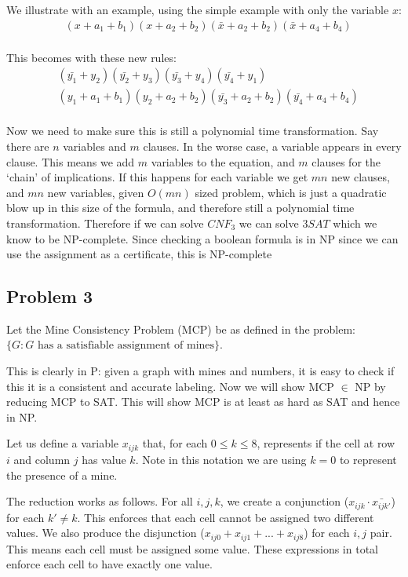 \documentclass[english]{article}
\begin{document}
We illustrate with an example, using the simple example with only the variable $x$:
\begin{align*}
& (x + a_1 + b_1)(x + a_2 + b_2)(\bar{x} + a_2 + b_2)(\bar{x} + a_4 + b_4) \\
\end{align*}

This becomes with these new rules:
\begin{align*}
& (\bar{y_1} + y_2)(\bar{y_2} + y_3)(\bar{y_3} + y_4)(\bar{y_4} + y_1) \\
& (y_1 + a_1 + b_1)(y_2 + a_2 + b_2)(\bar{y_3} + a_2 + b_2)(\bar{y_4} + a_4 + b_4) \\
\end{align*}

Now we need to make sure this is still a polynomial time transformation. Say there are $n$ variables and $m$
clauses. In the worse case, a variable appears in every clause. This means we add $m$ variables to the equation,
and $m$ clauses for the `chain' of implications. If this happens for each variable we get $mn$ new clauses, and
$mn$ new variables, given $O(mn)$ sized problem, which is just a quadratic blow up in this size of the formula,
and therefore still a polynomial time transformation. Therefore if we can solve $CNF_3$ we can solve $3SAT$ which
we know to be NP-complete. Since checking a boolean formula is in NP since we can use the assignment as a 
certificate, this is NP-complete

\subsection*{Problem 3}
Let the Mine Consistency Problem (MCP) be as defined in the problem:\\
$\{G : G \text{ has a satisfiable assignment of mines}\}$.

This is clearly in P: given a graph with mines and numbers, it is easy to check if this it is a
consistent and accurate labeling. Now we will show MCP $\in$ NP by reducing MCP to SAT. This will
show MCP is at least as hard as SAT and hence in NP.

Let us define a variable $x_{ijk}$ that, for each $0 \le k \le 8$, represents if the cell at row $i$
and column $j$ has value $k$. Note in this notation we are using $k = 0$ to represent the presence
of a mine.

The reduction works as follows. For all $i,j,k$, we create a conjunction
($x_{ijk} \cdot \bar{x_{ijk'}}$)
for each $k' \neq k$. This enforces that each cell cannot be assigned two different values. We also 
produce the disjunction ($x_{ij0} + x_{ij1} + ... + x_{ij8}$) for each $i,j$ pair. This means each cell 
must be assigned some value. These expressions in total enforce each cell to have exactly one value.
\end{document}
